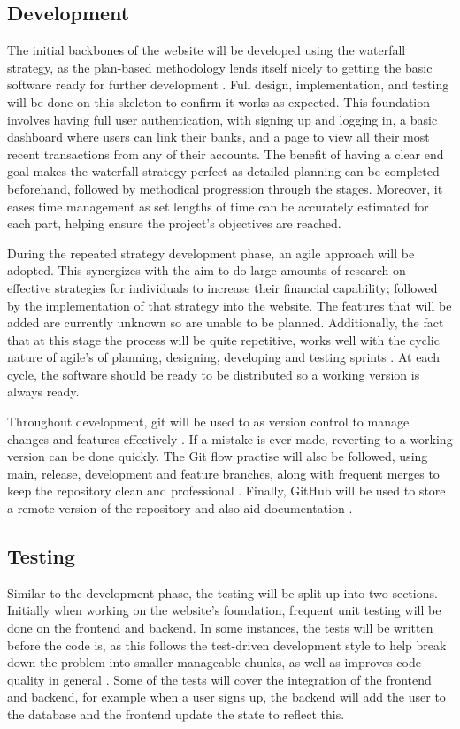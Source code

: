 \subsection{Development}
The initial backbones of the website will be developed using the waterfall strategy, as the plan-based methodology lends itself nicely to getting the basic software ready for further development \cite{WaterfallVsAgile}. Full design, implementation, and testing will be done on this skeleton to confirm it works as expected. This foundation involves having full user authentication, with signing up and logging in, a basic dashboard where users can link their banks, and a page to view all their most recent transactions from any of their accounts. The benefit of having a clear end goal makes the waterfall strategy perfect as detailed planning can be completed beforehand, followed by methodical progression through the stages. Moreover, it eases time management as set lengths of time can be accurately estimated for each part, helping ensure the project's objectives are reached.

During the repeated strategy development phase, an agile approach will be adopted. This synergizes with the aim to do large amounts of research on effective strategies for individuals to increase their financial capability; followed by the implementation of that strategy into the website. The features that will be added are currently unknown so are unable to be planned. Additionally, the fact that at this stage the process will be quite repetitive, works well with the cyclic nature of agile's of planning, designing, developing and testing sprints \cite{WaterfallVsAgile}. At each cycle, the software should be ready to be distributed so a working version is always ready.

Throughout development, git will be used to as version control to manage changes and features effectively \cite{Git}. If a mistake is ever made, reverting to a working version can be done quickly. The Git flow practise will also be followed, using main, release, development and feature branches, along with frequent merges to keep the repository clean and professional \cite{GitFlow}. Finally, GitHub will be used to store a remote version of the repository and also aid documentation \cite{GitHub}.

\subsection{Testing}
Similar to the development phase, the testing will be split up into two sections. Initially when working on the website's foundation, frequent unit testing will be done on the frontend and backend. In some instances, the tests will be written before the code is, as this follows the test-driven development style to help break down the problem into smaller manageable chunks, as well as improves code quality in general \cite{TDD}. Some of the tests will cover the integration of the frontend and backend, for example when a user signs up, the backend will add the user to the database and the frontend update the state to reflect this.

